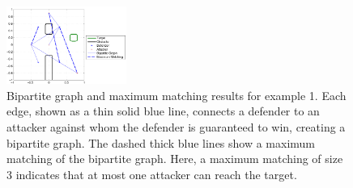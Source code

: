 \begin{figure}[h]
	\centering
	\includegraphics[width=0.35\textwidth]{"fig/max matching 1"}
	\caption{Bipartite graph and maximum matching results for example 1. Each edge, shown as a thin solid blue line, connects a defender to an attacker against whom the defender is guaranteed to win, creating a bipartite graph. The dashed thick blue lines show a maximum matching of the bipartite graph. Here, a maximum matching of size 3 indicates that at most one attacker can reach the target.}
	\label{fig:max_matching_1}
	

\label{fig:results1}
\end{figure}

